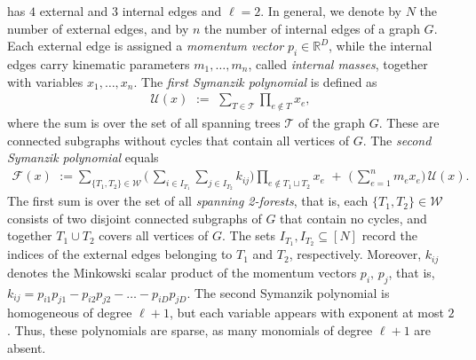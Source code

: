 \documentclass[a4paper,11pt]{amsart}
\theoremstyle{definition}
\begin{document}
has $4$ external and $3$ internal edges and $\ell = 2$. In general, we denote by $N$ the number of external edges, and by $n$ the number of internal edges of a graph $G$. Each external edge is assigned a \emph{momentum vector} $p_i \in \mathbb{R}^D$, while the internal edges carry kinematic parameters $m_1,\dots,m_n$, called \emph{internal masses}, together with variables $x_1,\dots,x_n$. The \emph{first Symanzik polynomial} is defined as
\begin{align*}
    \mathcal{U}(x) \,\,:=\,\, \sum_{T \in \mathcal{T}} \prod_{e \notin T} x_e,
\end{align*}
where the sum is over the set of all spanning trees $\mathcal{T}$ of the graph $G$. These are connected subgraphs without
cycles that contain all vertices of $G$. The \emph{second Symanzik polynomial} equals
\begin{align}
\label{Eq:F}
    \mathcal{F}(x)\,\, := \sum_{\{T_1,T_2\} \in \mathcal{W}}\!\biggl( \,\sum_{i \in I_{T_1}} \sum_{j \in I_{T_2}} k_{ij} 
    \biggr) \!\! \prod_{e \notin T_1 \sqcup T_2} \!\! \!x_e \,
    \,+ \,\,\biggl(\,\sum_{e=1}^n m_e x_e \biggr)\, \mathcal{U}(x).
\end{align}
The first sum is over the set of all \emph{spanning 2-forests}, that is, each $\{T_1,T_2\} \in \mathcal{W}$ consists of two disjoint connected subgraphs of $G$ that contain no cycles, and together $T_1 \cup T_2$ covers all vertices of $G$. The sets $I_{T_1}, I_{T_2} \subseteq [N]$ record the indices of the external edges belonging to $T_1$ and $T_2$, respectively.
Moreover, $k_{ij}$ denotes the Minkowski scalar product of the momentum vectors $p_i, \, p_j$, that is, $k_{ij} = p_{i1}p_{j1} -  p_{i2}p_{j2}-\dots -  p_{iD}p_{jD}$. The second Symanzik polynomial is homogeneous of degree $\ell+1$, but each variable appears with exponent at most $2$. Thus, these polynomials are sparse, as many monomials of degree $\ell+1$ are absent.
\end{document}
